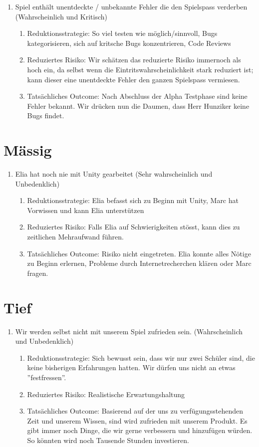 \begin{enumerate}
    \item Spiel enthält unentdeckte / unbekannte Fehler die den Spielspass verderben (Wahrscheinlich und Kritisch)
    \begin{enumerate}
        \item Reduktionsstrategie: So viel testen wie möglich/sinnvoll, Bugs kategorisieren, sich auf kritsche Bugs konzentrieren, Code Reviews
        \item Reduziertes Risiko: Wir schätzen das reduzierte Risiko immernoch als hoch ein, da selbst wenn die Eintritswahrscheinlichkeit stark reduziert ist; kann dieser eine unentdeckte Fehler den ganzen Spielspass vermiesen.
        \item Tatsächliches Outcome: Nach Abschluss der Alpha Testphase sind keine Fehler bekannt. Wir drücken nun die Daumen, dass Herr Hunziker keine Bugs findet.
    \end{enumerate}

\end{enumerate}

\section{Mässig}
\begin{enumerate}
    \item Elia hat noch nie mit Unity gearbeitet (Sehr wahrscheinlich und Unbedenklich)
    \begin{enumerate}
        \item Reduktionsstrategie: Elia befasst sich zu Beginn mit Unity, Marc hat Vorwissen und kann Elia unterstützen
        \item Reduziertes Risiko: Falls Elia auf Schwierigkeiten stösst, kann dies zu zeitlichen Mehraufwand führen.
        \item Tatsächliches Outcome: Risiko nicht eingetreten. Elia konnte alles Nötige zu Beginn erlernen, Probleme durch Internetrecherchen klären oder Marc fragen. 
    \end{enumerate}
\end{enumerate}

\section{Tief}
\begin{enumerate}
    \item Wir werden selbst nicht mit unserem Spiel zufrieden sein. (Wahrscheinlich und Unbedenklich)
    \begin{enumerate}
        \item Reduktionsstrategie: Sich bewusst sein, dass wir nur zwei Schüler sind, die keine bisherigen Erfahrungen hatten. Wir dürfen uns nicht an etwas ''festfressen''.
        \item Reduziertes Risiko: Realistische Erwartungshaltung
        \item Tatsächliches Outcome: Basierend auf der uns zu verfügungsstehenden Zeit und unserem Wissen, sind wird zufrieden mit unserem Produkt. Es gibt immer noch Dinge, die wir gerne verbessern und hinzufügen würden. So könnten wird noch Tausende Stunden investieren.
    \end{enumerate}
\end{enumerate}
